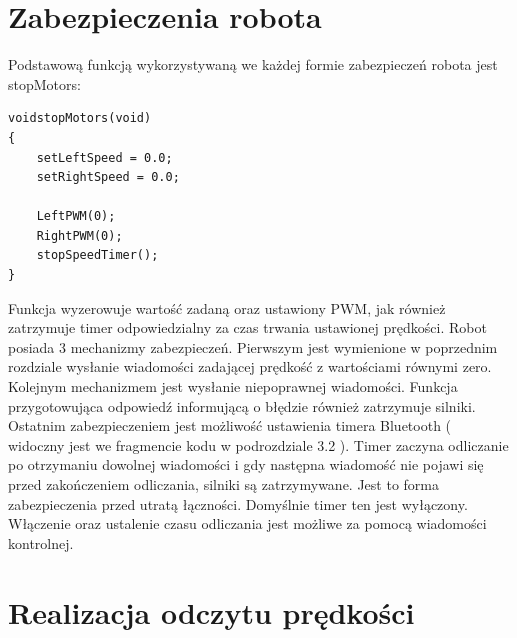 \documentclass[eng,printmode]{mgr}
\begin{document}
 \section{Zabezpieczenia robota}

Podstawową funkcją wykorzystywaną we każdej formie zabezpieczeń robota jest stopMotors:
\begin{lstlisting}[style=c]
voidstopMotors(void)
{
	setLeftSpeed = 0.0;
	setRightSpeed = 0.0;

	LeftPWM(0);
	RightPWM(0);
	stopSpeedTimer();
}
\end{lstlisting}
Funkcja wyzerowuje wartość zadaną oraz ustawiony PWM, jak również zatrzymuje timer odpowiedzialny za czas trwania ustawionej prędkości. Robot posiada 3 mechanizmy zabezpieczeń. Pierwszym jest wymienione w poprzednim rozdziale wysłanie wiadomości zadającej prędkość z wartościami równymi zero. Kolejnym mechanizmem jest wysłanie niepoprawnej wiadomości. Funkcja przygotowująca odpowiedź informującą o błędzie również zatrzymuje silniki. Ostatnim zabezpieczeniem jest możliwość ustawienia timera Bluetooth ( widoczny jest we fragmencie kodu w podrozdziale 3.2 ). Timer zaczyna odliczanie po otrzymaniu dowolnej wiadomości i gdy następna wiadomość nie pojawi się przed zakończeniem odliczania, silniki są zatrzymywane. Jest to forma zabezpieczenia przed utratą łączności. Domyślnie timer ten jest wyłączony. Włączenie oraz ustalenie czasu odliczania jest możliwe za pomocą wiadomości kontrolnej.

 \section{Realizacja odczytu prędkości}
\end{document}
